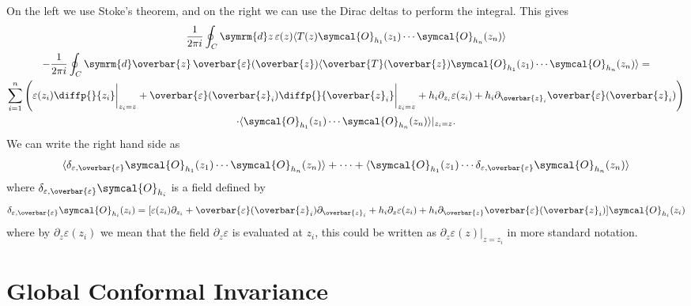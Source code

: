 \documentclass[fleqn]{NotesClass}
\renewcommand{\dl}[1]{\symrm{d}#1}
\newcommand{\quantumField}[1]{\symcal{#1}}
\DeclarePairedDelimiter{\correlator}{\langle}{\rangle}
\begin{document}
    On the left we use Stoke's theorem, and on the right we can use the Dirac deltas to perform the integral.
    This gives
    \begin{multline}
        \frac{1}{2\pi i} \oint_C \dl{z} \, \varepsilon(z) \correlator{T(z) \quantumField{O}_{h_1}(z_1) \dotsm \quantumField{O}_{h_n}(z_n)}\\
        - \frac{1}{2\pi i} \oint_C \dl{\overbar{z}} \, \overbar{\varepsilon}(\overbar{z}) \correlator{\overbar{T}(\overbar{z}) \quantumField{O}_{h_1}(z_1) \dotsm \quantumField{O}_{h_n}(z_n)} =\\
        \sum_{i=1}^n \left( \varepsilon(z_i) \diffp{}{z_i}\bigg|_{z_i = z} + \overbar{\varepsilon}(\overbar{z}_i) \diffp{}{\overbar{z}_i}\bigg|_{z_i = z} + h_i \partial_{z_i}\varepsilon(z_i) + h_i \partial_{\overbar{z}_i} \overbar{\varepsilon}(\overbar{z}_i) \right)\\
        \cdot\correlator{\quantumField{O}_{h_1}(z_1) \dotsm \quantumField{O}_{h_n}(z_n)}|_{z_i = z}.
    \end{multline}
    We can write the right hand side as
    \begin{equation}
        \correlator{\delta_{\varepsilon,\overbar{\varepsilon}}\quantumField{O}_{h_1}(z_1) \dotsm \quantumField{O}_{h_n}(z_n)} + \dotsb + \correlator{\quantumField{O}_{h_1}(z_1) \dotsm \delta_{\varepsilon, \overbar{\varepsilon}} \quantumField{O}_{h_n}(z_n)}
    \end{equation}
    where \(\delta_{\varepsilon,\overbar{\varepsilon}}\quantumField{O}_{h_i}\) is a field defined by
    \begin{equation}
        \delta_{\varepsilon,\overbar{\varepsilon}}\quantumField{O}_{h_i}(z_i) = [\varepsilon(z_i)\partial_{z_i} + \overbar{\varepsilon}(\overbar{z}_i)\partial_{\overbar{z}_i} + h_i\partial_z\varepsilon(z_i) + h_i\partial_{\overbar{z}}\overbar{\varepsilon}(\overbar{z}_i)]\quantumField{O}_{h_i}(z_i)
    \end{equation}
    where by \(\partial_z\varepsilon(z_i)\) we mean that the field \(\partial_z\varepsilon\) is evaluated at \(z_i\), this could be written as \(\partial_z\varepsilon(z)|_{z=z_i}\) in more standard notation.
    
    \chapter{Global Conformal Invariance}
\end{document}
